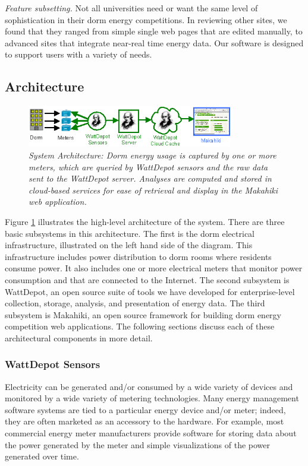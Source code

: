 {\em Feature subsetting.} Not all universities need or want the same 
level of sophistication in their dorm energy competitions.  In reviewing 
other sites, we found that they ranged from simple single web pages that are 
edited manually, to advanced sites that integrate near-real time energy data. 
Our software is designed to support users with a variety of needs. 

\subsection{Architecture}

\begin{figure}[!th]
  \center
  \includegraphics[width=0.8\textwidth]{architecture.eps}
  \caption{\em \small System Architecture: Dorm energy usage is captured by one or more meters, which 
are queried by WattDepot sensors and the raw data sent to the WattDepot server. Analyses are computed
and stored in cloud-based services for ease of retrieval and display in the Makahiki web application.}
  \label{fig:architecture}
\end{figure} 

Figure \ref{fig:architecture} illustrates the high-level architecture of
the system. There are three basic subsystems in this architecture.  The
first is the dorm electrical infrastructure, illustrated on the left hand
side of the diagram.  This infrastructure includes power distribution to
dorm rooms where residents consume power.  It also includes one or more
electrical meters that monitor power consumption and that are connected to
the Internet.  The second subsystem is WattDepot, an open source suite of
tools we have developed for enterprise-level collection, storage, analysis,
and presentation of energy data. The third subsystem is Makahiki, an open
source framework for building dorm energy competition web applications.
The following sections discuss each of these architectural components in
more detail.

\subsubsection{WattDepot Sensors}

Electricity can be generated and/or consumed by a wide variety of devices
and monitored by a wide variety of metering technologies.  Many energy
management software systems are tied to a particular energy device and/or
meter; indeed, they are often marketed as an accessory to the hardware.
For example, most commercial energy meter manufacturers provide software
for storing data about the power generated by the meter and simple
visualizations of the power generated over time.

